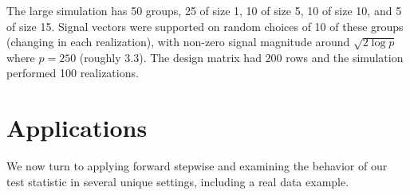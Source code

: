 \documentclass{imsart}
\begin{document}


The large simulation has 50 groups, 25 of size 1, 10 of size 5, 10 of
size 10, and 5 of size 15. Signal vectors were supported on random
choices of 10 of these groups (changing in each realization), with
non-zero signal magnitude around $\sqrt{2\log p}$ where $p = 250$
(roughly 3.3). The design matrix had 200 rows and the simulation
performed 100 realizations.



\section{Applications}
\label{sec:applications}
We now turn to applying forward stepwise and examining the behavior of
our test statistic in several unique settings, including a real data
example.
\end{document}

